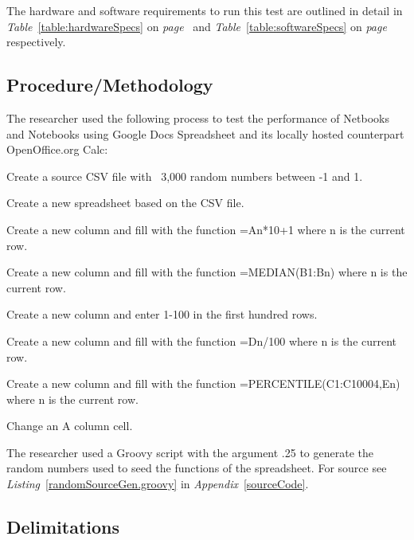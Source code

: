 The hardware and software requirements to run this test are outlined in detail
in \emph{Table}~\ref{table:hardwareSpecs} on \emph{page}~\pageref{table:hardwareSpecs}
and \emph{Table}~\ref{table:softwareSpecs} on \emph{page}~\pageref{table:softwareSpecs}
respectively.





\subsection{Procedure/Methodology}

\label{sec:proc}

The researcher used the following process to test the performance of Netbooks
and Notebooks using Google Docs Spreadsheet and its locally hosted counterpart
OpenOffice.org Calc:

\begin{compactenum}
\item Create a source CSV file with ~3,000 random numbers between -1 and
  1.  \label{item:proc1}
\item Create a new spreadsheet based on the CSV file.  \label{item:proc2}
\item Create a new column and fill with the function =An*10+1 where n is the
  current row.  \label{item:proc3}
\item Create a new column and fill with the function =MEDIAN(B1:Bn) where n is
  the current row.  \label{item:proc4}
\item Create a new column and enter 1-100 in the first hundred
  rows.  \label{item:proc5}
\item Create a new column and fill with the function =Dn/100 where n is the
  current row.  \label{item:proc6}
\item Create a new column and fill with the function =PERCENTILE(C1:C10004,En)
  where n is the current row.  \label{item:proc7}
\item Change an A column cell.  \label{item:proc8}
\end{compactenum}

The researcher used a Groovy script with the argument .25 to generate the random
numbers used to seed the functions of the spreadsheet.  For source see
\emph{Listing}~\ref{randomSourceGen.groovy} in \emph{Appendix}~\ref{sourceCode}.

\subsection{Delimitations}

